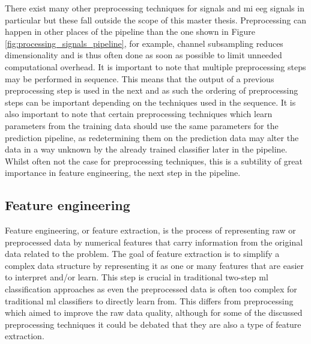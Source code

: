 There exist many other preprocessing techniques for signals and \gls{mi} \gls{eeg} signals in particular but these fall outside the scope of this master thesis.
Preprocessing can happen in other places of the pipeline than the one shown in Figure \ref{fig:processing_signals_pipeline}, for example, channel subsampling reduces dimensionality and is thus often done as soon as possible to limit unneeded computational overhead.
It is important to note that multiple preprocessing steps may be performed in sequence.
This means that the output of a previous preprocessing step is used in the next and as such the ordering of preprocessing steps can be important depending on the techniques used in the sequence.
It is also important to note that certain preprocessing techniques which learn parameters from the training data should use the same parameters for the prediction pipeline, as redetermining them on the prediction data may alter the data in a way unknown by the already trained classifier later in the pipeline.
Whilst often not the case for preprocessing techniques, this is a subtility of great importance in feature engineering, the next step in the pipeline.




\subsection{Feature engineering}
\label{subsec:processing_signals_general_pipeline_features}

Feature engineering, or feature extraction, is the process of representing raw or preprocessed data by numerical features that carry information from the original data related to the problem.
The goal of feature extraction is to simplify a complex data structure by representing it as one or many features that are easier to interpret and/or learn.
This step is crucial in traditional two-step \gls{ml} classification approaches as even the preprocessed data is often too complex for traditional \gls{ml} classifiers to directly learn from.
This differs from preprocessing which aimed to improve the raw data quality, although for some of the discussed preprocessing techniques it could be debated that they are also a type of feature extraction.

